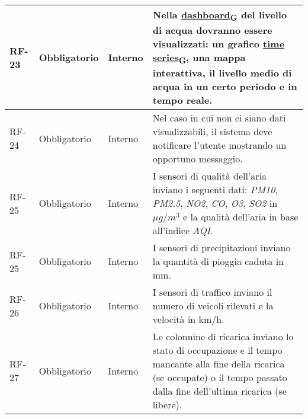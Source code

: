 \begin{longtable}{|>{\centering\arraybackslash}m{}|>{\centering\arraybackslash}m{}|>{\centering\arraybackslash}m{}|>{\centering\arraybackslash}m{}|}
	RF-23           & Obbligatorio        & Interno        & Nella \href{https://7last.github.io/docs/rtb/documentazione-interna/glossario\#dashboard}{dashboard\textsubscript{G}} del livello di acqua dovranno essere visualizzati: un grafico \href{https://7last.github.io/docs/rtb/documentazione-interna/glossario\#time-series}{time series\textsubscript{G}}, una mappa interattiva, il livello medio di acqua in un certo periodo e in tempo reale.                                                                                                                       \\\hline
	RF-24           & Obbligatorio        & Interno        & Nel caso in cui non ci siano dati visualizzabili, il sistema deve notificare l'utente mostrando un opportuno messaggio.                                                                                                                                                                                 \\\hline
	RF-25           & Obbligatorio        & Interno        & I sensori di qualità dell'aria inviano i seguenti dati: \textit{PM10}, \textit{PM2.5}, \textit{NO2}, \textit{CO}, \textit{O3}, \textit{SO2} in $\mu g/m^3$ e la qualità dell'aria in base all'indice \textit{AQI}.                                                                                      \\\hline
	RF-25           & Obbligatorio        & Interno        & I sensori di precipitazioni inviano la quantità di pioggia caduta in mm.                                                                                                                                                                                                                                \\\hline
	RF-26           & Obbligatorio        & Interno        & I sensori di traffico inviano il numero di veicoli rilevati e la velocità in km/h.                                                                                                                                                                                                                      \\\hline
	RF-27           & Obbligatorio        & Interno        & Le colonnine di ricarica inviano lo stato di occupazione e il tempo mancante alla fine della ricarica (se occupate) o il tempo passato dalla fine dell'ultima ricarica (se libere).                                                                                                                     \\\hline

\end{longtable}
